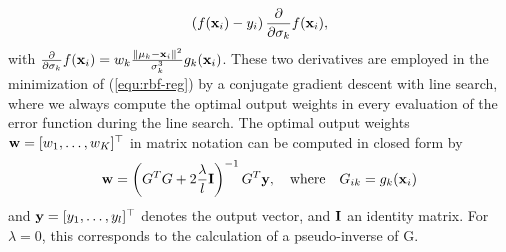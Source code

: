 \documentclass{article}
\begin{document}
\begin{appendix}
\begin{equation}
  \left(f({\bf x}_i)- y_i\right)
  \frac{\partial}{\partial \sigma_k} f({\bf x}_i), \label{equ:grad_C_sigma}
\end{equation}
with $\frac{\partial}{\partial \sigma_k}f({\bf x}_i) = w_k\frac{\|{\bf
    \mu}_k-{\bf x}_i\|^{2} }{\sigma_k^3} g_k({\bf x}_i)$.  These two derivatives are
employed in the minimization of (\ref{equ:rbf-reg}) by a conjugate gradient
descent with line search, where we always compute the optimal output weights
in every evaluation of the error function during the line search. The optimal
output weights ${\bf w}= [w_1, \ldots, w_K ]^\top$ in matrix notation can be
computed in closed form by
\begin{equation}
  \label{equ:opt_weight_vector}
  {\bf w} = \left(G^T G + 2 \frac{\lambda}{l} {\bf I} \right)^{-1} G^T {\bf y}, \quad \mbox{where} \quad G_{ik} = g_k({\bf x}_i)
\end{equation}
and ${\bf y} = [y_1 , \ldots , y_l ]^\top$ denotes the output
vector, and $\bf I$ an identity matrix. For $\lambda=0$, this
corresponds to the calculation of a pseudo-inverse of G.


\end{appendix}
\end{document}
